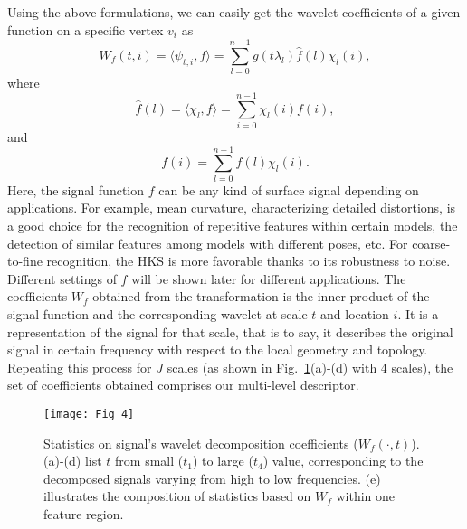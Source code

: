 Using the above formulations, we can easily get the wavelet
coefficients of a given function on a specific vertex $v_i$ as
\begin{equation}
\label{eq:WMD}
W_f(t,i) = \langle \psi_{t,i},f \rangle = \sum_{l=0}^{n-1}g(t\lambda_l)\hat{f}(l)\chi_l(i),
\end{equation}
where
\begin{equation}
  \hat{f}(l) = \langle \chi_l,f \rangle = \sum_{i=0}^{n-1} \chi_l(i)f(i),
\end{equation}
and
\begin{equation}
  f(i) = \sum_{l=0}^{n-1} \hat{f}(l) \chi_l(i).
\end{equation}
Here, the signal function $f$ can be any kind of surface signal
depending on applications. For example, mean curvature,
characterizing detailed distortions, is a good choice for the
recognition of repetitive features within certain models, the
detection of similar features among models with different poses, etc.
For coarse-to-fine recognition, the HKS is more favorable thanks to
its robustness to noise. Different settings of $f$ will be shown
later for different applications. The coefficients $W_f$
obtained from the transformation is the inner product of the signal
function and the corresponding wavelet at scale $t$ and location $i$.
It is a representation of the signal for that scale, that is to say,
it describes the original signal in certain frequency with respect to
the local geometry and topology. Repeating this process for $J$
scales (as shown in Fig.~\ref{wmd}(a)-(d) with 4 scales), the set of
coefficients obtained comprises our multi-level descriptor.

\begin{figure}[!to]
\begin{center}
\texttt{[image: Fig\_4]}
\end{center}
\caption[Statistics on wavelet decomposition coefficients.]
  {Statistics on signal's wavelet decomposition coefficients
  ($W_f(\cdot,t)$). (a)-(d) list $t$ from small ($t_1$) to large
  ($t_4$) value, corresponding to the decomposed signals varying from
  high to low frequencies. (e) illustrates the composition of
  statistics based on $W_f$ within one feature region.}
\label{wmd}
\end{figure}

